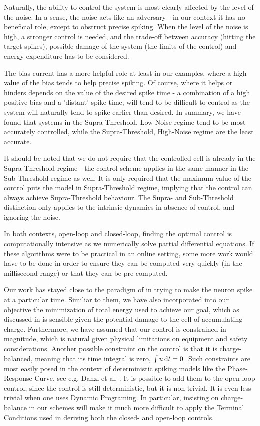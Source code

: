 Naturally, the ability to control the system is most clearly affected by the
level of the noise. In a sense, the noise acts like an adversary - in our
context it has no beneficial role, except to obstruct precise spiking.
When the level of the noise is high, a stronger control is needed, and
the trade-off between accuracy (hitting the target spikes), possible
damage of the system (the limits of the control) and energy expenditure
has to be considered.

The bias current has a more helpful role at least in our examples, where a
high value of the bias tends to help precise spiking. Of course, where it helps
or hinders depends on the value of the desired spike time - a combination of a
high positive bias and a 'distant' spike time, will tend to be difficult to
control as the system will naturally tend to spike earlier than desired.
In summary, we have found that systems in the Supra-Threshold, Low-Noise regime
tend to be most accurately controlled, while the Supra-Threshold, High-Noise
regime are the least accurate. 

It should be noted that we do not require that the controlled
cell is already in the Supra-Threshold regime - the control scheme
applies in the same manner in the Sub-Threshold regime as well. It is
only required that the maximum value of the control puts the 
model in Supra-Threshold regime, implying that the control can 
always achieve Supra-Threshold behaviour. The Supra- and Sub-Threshold
distinction only applies to the intrinsic dynamics in
absence of control, and ignoring the noise.

In both contexts, open-loop and closed-loop, finding the optimal control is
computationally intensive as we numerically solve partial differential
equations. If these algorithms were to be practical in an online setting, some
more work would have to be done in order to ensure they can be computed very
quickly (in the millisecond range) or that they can be pre-computed.

Our work has stayed close to the paradigm of \cite{Ahmadian2011} in
trying to make the neuron spike at a particular time. 
Similiar to them, we have also incorporated into our objective
the minimization of total energy used to achieve our goal, which as discussed in
\cite{Ahmadian2011} is sensible given the potential damage to the cell of
accumulating charge. Furthermore, we have assumed that our control is
constrained in magnitude, which is natural given physical limitations on
equipment and safety considerations. Another possible constraint on the control
is that it is charge-balanced, meaning that its time integral is zero, $\int u
\, \mathrm{d} t = 0$. Such constraints are most easily posed in the context of
deterministic spiking models like the Phase-Response Curve, see e.g. Danzl et
al. \cite{Danzl2010}. It is possible to add them to the open-loop control, since
the control is still deterministic, but it is non-trivial. It is even less
trivial when one uses Dynamic Programing. In
particular, insisting on charge-balance in our schemes will make it much more
difficult to apply the Terminal Conditions used in deriving both the closed- and
open-loop controls.

